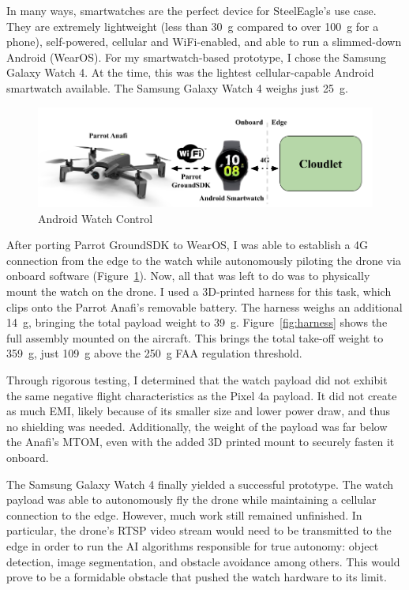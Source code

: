 In many ways, smartwatches are the perfect device for SteelEagle's use case. They are extremely lightweight (less than 30~g compared to over 100~g for a phone), self-powered, cellular and WiFi-enabled, and able to run a slimmed-down Android (WearOS). For my smartwatch-based prototype, I chose the Samsung Galaxy Watch 4. At the time, this was the lightest cellular-capable Android smartwatch available. The Samsung Galaxy Watch 4 weighs just 25~g.

\begin{figure}
    \centering
    \includegraphics[width=1.0\linewidth]{chapter3/FIGS/onboard-watch.png}
    \caption{Android Watch Control~\cite{ParrotAnafi}}
    \label{fig:watch-control}
\end{figure}

After porting Parrot GroundSDK to WearOS, I was able to establish a 4G connection from the edge to the watch while autonomously piloting the drone via onboard software (Figure~\ref{fig:watch-control}). Now, all that was left to do was to physically mount the watch on the drone. I used a 3D-printed harness for this task, which clips onto the Parrot Anafi's removable battery. The harness weighs an additional 14~g, bringing the total payload weight to 39~g. Figure~\ref{fig:harness} shows the full assembly mounted on the aircraft. This brings the total take-off weight to 359~g, just 109~g above the 250~g FAA regulation threshold.

Through rigorous testing, I determined that the watch payload did not exhibit the same negative flight characteristics as the Pixel 4a payload. It did not create as much EMI, likely because of its smaller size and lower power draw, and thus no shielding was needed. Additionally, the weight of the payload was far below the Anafi's MTOM, even with the added 3D printed mount to securely fasten it onboard.

The Samsung Galaxy Watch 4 finally yielded a successful prototype. The watch payload was able to autonomously fly the drone while maintaining a cellular connection to the edge. However, much work still remained unfinished. In particular, the drone's RTSP video stream would need to be transmitted to the edge in order to run the AI algorithms responsible for true autonomy: object detection, image segmentation, and obstacle avoidance among others. This would prove to be a formidable obstacle that pushed the watch hardware to its limit.


